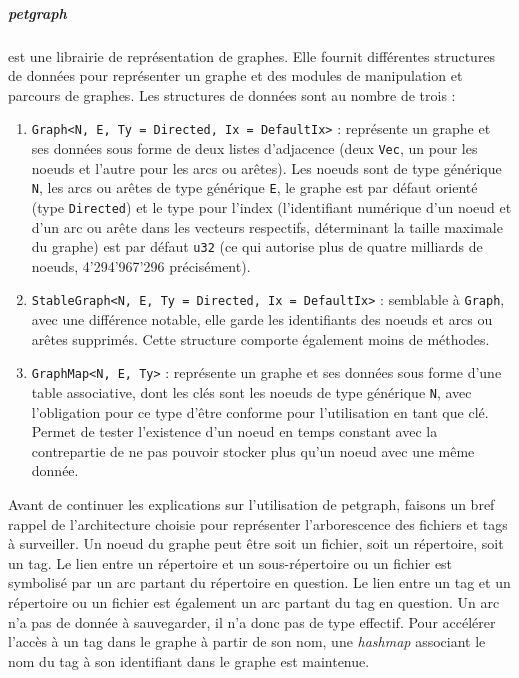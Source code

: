 \subparagraph{petgraph}\label{tag_engine_petgraph}
est une librairie de représentation de graphes. Elle fournit différentes structures de données pour 
représenter un graphe et des modules de manipulation et parcours de graphes. Les structures de 
données sont au nombre de trois :
\begin{enumerate}
    \item \texttt{Graph<N, E, Ty = Directed, Ix = DefaultIx>} : représente un graphe et 
        ses données sous forme de deux listes d'adjacence (deux \texttt{Vec}, un pour les 
        noeuds et l'autre pour les arcs ou arêtes). Les noeuds sont de type générique \texttt{N}, 
        les arcs ou arêtes de type générique \texttt{E}, le graphe est par défaut orienté (type 
        \texttt{Directed}) et le type pour l'index (l'identifiant numérique d'un noeud et 
        d'un arc ou arête dans les vecteurs respectifs, déterminant la taille maximale du graphe) 
        est par défaut \texttt{u32} (ce qui autorise plus de quatre milliards de noeuds, 
        4'294'967'296 précisément).
    \item \texttt{StableGraph<N, E, Ty = Directed, Ix = DefaultIx>} : semblable à 
        \texttt{Graph}, avec une différence notable, elle garde les identifiants des noeuds et 
        arcs ou arêtes supprimés. Cette structure comporte également moins de méthodes.
    \item \texttt{GraphMap<N, E, Ty>} : représente un graphe et ses données sous forme 
        d'une table associative, dont les clés sont les noeuds de type générique \texttt{N}, 
        avec l'obligation pour ce type d'être conforme pour l'utilisation en tant que clé. Permet 
        de tester l'existence d'un noeud en temps constant avec la contrepartie de ne pas pouvoir 
        stocker plus qu'un noeud avec une même donnée.
\end{enumerate}
Avant de continuer les explications sur l'utilisation de petgraph, faisons un bref rappel de l'architecture 
choisie pour représenter l'arborescence des fichiers et tags à surveiller. Un noeud du graphe peut 
être soit un fichier, soit un répertoire, soit un tag. Le lien entre un répertoire et un sous-répertoire 
ou un fichier est symbolisé par un arc partant du répertoire en question. Le lien entre un tag et 
un répertoire ou un fichier est également un arc partant du tag en question. Un arc n'a pas de 
donnée à sauvegarder, il n'a donc pas de type effectif. Pour accélérer l'accès à un tag dans le 
graphe à partir de son nom, une \textit{hashmap} associant le nom du tag à son identifiant dans le graphe 
est maintenue.

